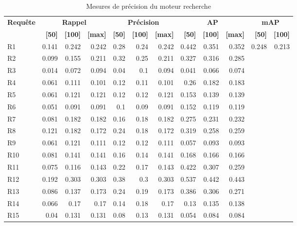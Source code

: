 \begin{table}[H]
\centering
\begin{tabular}{l|rrr|rrr|rrr|rr}
\toprule
\textbf{Requête} & \multicolumn{3}{c}{\textbf{Rappel}} & \multicolumn{3}{c}{\textbf{Précision}} & \multicolumn{3}{c}{\textbf{AP}} & \multicolumn{2}{c}{\textbf{mAP}} \\
 & \textbf{[50]} & \textbf{[100]} & \textbf{[max]} & \textbf{[50]} & \textbf{[100]} & \textbf{[max]} & \textbf{[50]} & \textbf{[100]} & \textbf{[max]} & \textbf{[50]} & \textbf{[100]} \\
\midrule
R1 & 0.141 & 0.242 & 0.242 & 0.28 & 0.24 & 0.242 & 0.442 & 0.351 & 0.352 & \multirow{15}{*}{0.248} & \multirow{15}{*}{0.213} \\
R2 & 0.099 & 0.155 & 0.211 & 0.32 & 0.25 & 0.211 & 0.327 & 0.316 & 0.285 \\
R3 & 0.014 & 0.072 & 0.094 & 0.04 & 0.1 & 0.094 & 0.041 & 0.066 & 0.074 \\
R4 & 0.061 & 0.111 & 0.101 & 0.12 & 0.11 & 0.101 & 0.26 & 0.182 & 0.183 \\
R5 & 0.061 & 0.121 & 0.121 & 0.12 & 0.12 & 0.121 & 0.153 & 0.139 & 0.139 \\
R6 & 0.051 & 0.091 & 0.091 & 0.1 & 0.09 & 0.091 & 0.152 & 0.119 & 0.119 \\
R7 & 0.081 & 0.182 & 0.182 & 0.16 & 0.18 & 0.182 & 0.275 & 0.231 & 0.232 \\
R8 & 0.121 & 0.182 & 0.172 & 0.24 & 0.18 & 0.172 & 0.319 & 0.258 & 0.259 \\
R9 & 0.061 & 0.121 & 0.111 & 0.12 & 0.12 & 0.111 & 0.057 & 0.093 & 0.093 \\
R10 & 0.081 & 0.141 & 0.141 & 0.16 & 0.14 & 0.141 & 0.168 & 0.166 & 0.166 \\
R11 & 0.075 & 0.116 & 0.143 & 0.22 & 0.17 & 0.143 & 0.422 & 0.307 & 0.259 \\
R12 & 0.192 & 0.303 & 0.303 & 0.38 & 0.3 & 0.303 & 0.537 & 0.442 & 0.443 \\
R13 & 0.086 & 0.137 & 0.173 & 0.24 & 0.19 & 0.173 & 0.386 & 0.306 & 0.271 \\
R14 & 0.066 & 0.17 & 0.17 & 0.14 & 0.18 & 0.17 & 0.13 & 0.135 & 0.138 \\
R15 & 0.04 & 0.131 & 0.131 & 0.08 & 0.13 & 0.131 & 0.054 & 0.084 & 0.084 \\
\bottomrule
\end{tabular}
\caption{Mesures de précision du moteur recherche}
\label{tab:results}
\end{table}
